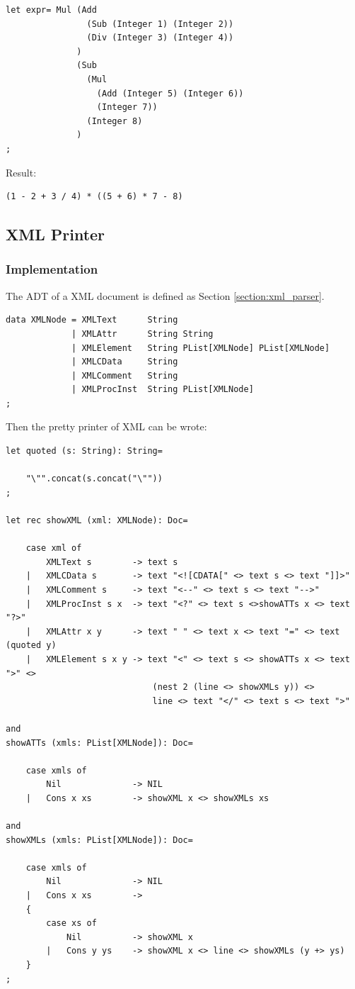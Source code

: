 \begin{lstlisting}
let expr= Mul (Add
                (Sub (Integer 1) (Integer 2))
                (Div (Integer 3) (Integer 4))
              )
              (Sub
                (Mul
                  (Add (Integer 5) (Integer 6))
                  (Integer 7))
                (Integer 8)
              )
;
\end{lstlisting}

Result:

\begin{lstlisting}
(1 - 2 + 3 / 4) * ((5 + 6) * 7 - 8)
\end{lstlisting}

\subsection{XML Printer}

\subsubsection{Implementation}
The ADT of a XML document is defined as Section \ref{section:xml_parser}.

\begin{lstlisting}
data XMLNode = XMLText      String
             | XMLAttr      String String
             | XMLElement   String PList[XMLNode] PList[XMLNode]
             | XMLCData     String
             | XMLComment   String
             | XMLProcInst  String PList[XMLNode]
;
\end{lstlisting}

Then the pretty printer of XML can be wrote:

\begin{lstlisting}
let quoted (s: String): String=

    "\"".concat(s.concat("\""))
;

let rec showXML (xml: XMLNode): Doc=

    case xml of
        XMLText s        -> text s
    |   XMLCData s       -> text "<![CDATA[" <> text s <> text "]]>"
    |   XMLComment s     -> text "<--" <> text s <> text "-->"
    |   XMLProcInst s x  -> text "<?" <> text s <>showATTs x <> text "?>"
    |   XMLAttr x y      -> text " " <> text x <> text "=" <> text (quoted y)
    |   XMLElement s x y -> text "<" <> text s <> showATTs x <> text ">" <>
                             (nest 2 (line <> showXMLs y)) <>
                             line <> text "</" <> text s <> text ">"
                             
and
showATTs (xmls: PList[XMLNode]): Doc=

    case xmls of
        Nil              -> NIL
    |   Cons x xs        -> showXML x <> showXMLs xs
    
and
showXMLs (xmls: PList[XMLNode]): Doc=

    case xmls of
        Nil              -> NIL
    |   Cons x xs        ->
    {
        case xs of
            Nil          -> showXML x
        |   Cons y ys    -> showXML x <> line <> showXMLs (y +> ys)
    }
;
\end{lstlisting}

